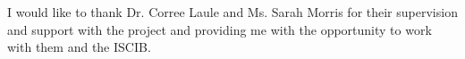 I would like to thank Dr. Corree Laule and Ms. Sarah Morris for their supervision and support with the project and providing me with the opportunity to work with them and the ISCIB.